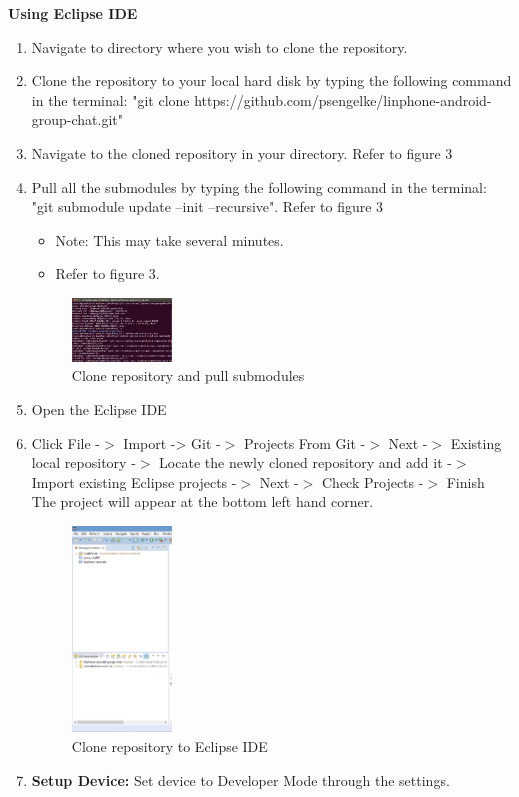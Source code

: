 \documentclass[11pt]{article}
\begin{document}
\textbf{Using Eclipse IDE}
\begin{enumerate}
\item Navigate to directory where you wish to clone the repository. 
\item Clone the repository to your local hard disk by typing the following command in the terminal: "git clone https://github.com/psengelke/linphone-android-group-chat.git" 
\item Navigate to the cloned repository in your directory. Refer to figure 3
\item Pull all the submodules by typing the following command in the terminal: "git submodule update --init --recursive". Refer to figure 3
\begin{itemize}
\item Note: This may take several minutes. 
\item Refer to figure 3.
\end{itemize}
\begin{figure}[H]
\includegraphics[width=100px]{./images/clone.png}
\caption{Clone repository and pull submodules}
\label{repoClone}
\end{figure}
\item Open the Eclipse IDE
\item Click File -$>$ Import -> Git -$>$ Projects From Git -$>$ Next -$>$ Existing local repository -$>$ Locate the newly cloned repository and add it -$>$ Import existing Eclipse projects -$>$ Next -$>$ Check Projects -$>$ Finish
\subitem The project will appear at the bottom left hand corner.
\begin{figure}[H]
\includegraphics[width=100px]{./images/git.png}
\caption{Clone repository to Eclipse IDE}
\label{repoClone}
\end{figure}
\item \textbf{Setup Device: } Set device to Developer Mode through the settings. 

\end{enumerate}
\end{document}
